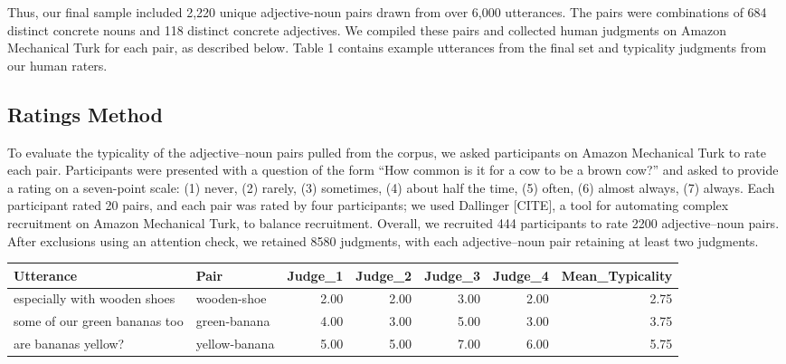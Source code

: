 \documentclass[10pt, letterpaper]{article}
\begin{document}
Thus, our final sample included 2,220 unique adjective-noun pairs drawn
from over 6,000 utterances. The pairs were combinations of 684 distinct
concrete nouns and 118 distinct concrete adjectives. We compiled these
pairs and collected human judgments on Amazon Mechanical Turk for each
pair, as described below. Table 1 contains example utterances from the
final set and typicality judgments from our human raters.

\hypertarget{ratings-method}{%
\subsection{Ratings Method}\label{ratings-method}}

To evaluate the typicality of the adjective--noun pairs pulled from the
corpus, we asked participants on Amazon Mechanical Turk to rate each
pair. Participants were presented with a question of the form ``How
common is it for a cow to be a brown cow?'' and asked to provide a
rating on a seven-point scale: (1) never, (2) rarely, (3) sometimes, (4)
about half the time, (5) often, (6) almost always, (7) always. Each
participant rated 20 pairs, and each pair was rated by four
participants; we used Dallinger {[}CITE{]}, a tool for automating
complex recruitment on Amazon Mechanical Turk, to balance recruitment.
Overall, we recruited 444 participants to rate 2200 adjective--noun
pairs. After exclusions using an attention check, we retained 8580
judgments, with each adjective--noun pair retaining at least two
judgments.

\begin{table}[tb]
\centering
\begin{tabular}{llrrrrr}
  \hline
Utterance & Pair & Judge\_1 & Judge\_2 & Judge\_3 & Judge\_4 & Mean\_Typicality \\ 
  \hline
especially with wooden shoes & wooden-shoe & 2.00 & 2.00 & 3.00 & 2.00 & 2.75 \\ 
  some of our green bananas too & green-banana & 4.00 & 3.00 & 5.00 & 3.00 & 3.75 \\ 
  are bananas yellow? & yellow-banana & 5.00 & 5.00 & 7.00 & 6.00 & 5.75 \\ 
   \hline
\end{tabular}
\end{table}
\end{document}
